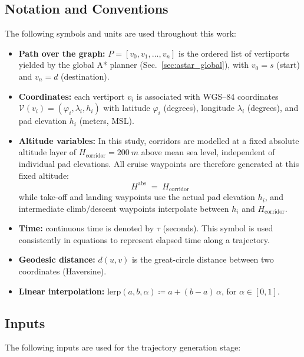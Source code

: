 \subsection{Notation and Conventions}
\label{s:traj_notation}

The following symbols and units are used throughout this work:
\begin{itemize}
  \item \textbf{Path over the graph:} $P = [v_0, v_1, \dots, v_n]$ is the ordered list of
  vertiports yielded by the global A* planner (Sec.~\ref{sec:astar_global}), with $v_0 = s$ (start)
  and $v_n = d$ (destination).

  \item \textbf{Coordinates:} each vertiport $v_i$ is associated with WGS–84 coordinates
  $\mathcal{V}(v_i) = (\varphi_i, \lambda_i, h_i)$ with
  latitude $\varphi_i$ (degrees), longitude $\lambda_i$ (degrees), and pad elevation $h_i$ (meters, MSL).

  \item \textbf{Altitude variables:} In this study, corridors are modelled at a fixed
    absolute altitude layer of \(H_{\text{corridor}}=\SI{200}{m}\) above mean sea level,
    independent of individual pad elevations. All cruise waypoints are therefore
    generated at this fixed altitude:
    \begin{equation}
        H^{\text{abs}} \;=\; H_{\text{corridor}}
    \end{equation}
    while take-off and landing waypoints use the actual pad elevation \(h_i\), and
    intermediate climb/descent waypoints interpolate between \(h_i\) and \(H_{\text{corridor}}\).

  \item \textbf{Time:} continuous time is denoted by $\tau$ (seconds). This symbol is used
  consistently in equations to represent elapsed time along a trajectory.

  \item \textbf{Geodesic distance:} $d(u,v)$ is the great-circle distance between two coordinates
  (Haversine).

  \item \textbf{Linear interpolation:} $\mathrm{lerp}(a,b,\alpha) \coloneqq a + (b-a)\,\alpha$, for $\alpha\in[0,1]$.
\end{itemize}


\subsection{Inputs}
The following inputs are used for the trajectory generation stage:

